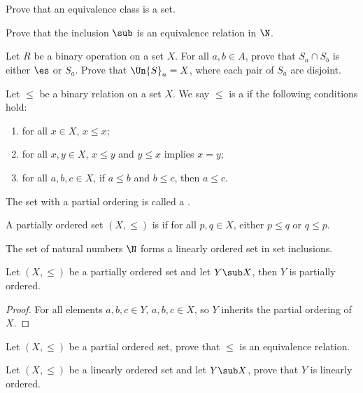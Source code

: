 \documentclass[10pt]{article}
\begin{document}
\begin{problem}
    Prove that an equivalence class is a set.
\end{problem}
\begin{problem}
    Prove that the inclusion $\sub$ is an equivalence relation in $\N$.
\end{problem}
\begin{problem}
    Let $R$ be a binary operation on a set $X$. For all $a,b\in A$, prove that ${S}_{a}\cap{S}_{b}$ is either $\es$ or ${S}_{a}$. Prove that $\Un{S}_{a}=X$, where each pair of ${S}_{a}$ are disjoint.
\end{problem}
\begin{definition}
    Let $\le$ be a binary relation on a set $X$. We say $\le$ is a  if the following conditions hold:
    \begin{enumerate}
        \item for all $x\in X$, $x\le x$;
        \item for all $x,y\in X$, $x\le y$ and $y\le x$ implies $x=y$;
        \item for all $a,b,c\in X$, if $a\le b$ and $b\le c$, then $a\le c$.
    \end{enumerate}
    The set with a partial ordering is called a .
\end{definition}
\begin{definition}
    A partially ordered set $(X,\le)$ is  if for all $p,q\in X$, either $p\le q$ or $q\le p$.
\end{definition}
\begin{example}
    The set of natural numbers $\N$ forms a linearly ordered set in set inclusions.
\end{example}
\begin{proposition}
    Let $(X,\le)$ be a partially ordered set and let $Y\sub X$, then $Y$ is partially ordered.
\end{proposition}
\begin{proof}
    For all elements $a,b,c\in Y$, $a,b,c\in X$, so $Y$ inherits the partial ordering of $X$.
\end{proof}
\begin{problem}
    Let $(X,\le)$ be a partial ordered set, prove that $\le$ is an equivalence relation.
\end{problem}
\begin{problem}
    Let $(X,\le)$ be a linearly ordered set and let $Y\sub X$, prove that $Y$ is linearly ordered.
\end{problem}
\end{document}
